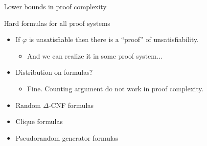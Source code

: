 \begin{frame}{Lower bounds in proof complexity}

    
    
\end{frame}

\begin{frame}{Hard formulas for all proof systems}

    \begin{itemize}
        \item If $\varphi$ is unsatisfiable then there is a ``proof'' of unsatisfiability.
            \pause
            \begin{itemize}
                \item \alert{And we can realize it in some proof system...}
            \end{itemize}
            \pause
        \item Distribution on formulas?
            \pause
            \begin{itemize}
                \item Fine. Counting argument do not work in proof complexity.
            \end{itemize}            
    \end{itemize}

    \pause

    \vspace{1cm}
    \begin{itemize}
        \item Random $\Delta$-CNF formulas
        \item Clique formulas
        \item Pseudorandom generator formulas
    \end{itemize}
\end{frame}


